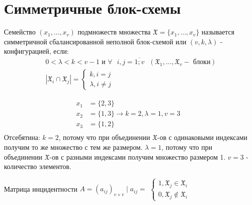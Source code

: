 \section{Симметричные блок-схемы}

\opr Семейство $(x_1, \dots, x_v)$ подмножеств множества $\mathfrak{X} = \lbrace x_1, \dots, x_v\rbrace$
называется симметричной сбалансированной неполной блок-схемой или $(v, k , \lambda)$ - конфигурацией, если:
\begin{align*}
	&0 < \lambda < k < v - 1 \text{ и } \forall \text{ } i, j  = \overline{1;v} \text{ } (\mathfrak{X}_1, \dots, \mathfrak{X}_v - \text{ блоки})\\
	&|\mathfrak{X}_i \cap \mathfrak{X}_j| = 
	\begin{cases}
		k, i = j \\
		\lambda, i \neq j
	\end{cases}
\end{align*}

\examplei

\begin{align*}
	x_1 &= \lbrace 2, 3 \rbrace \\
	x_2 &= \lbrace 1, 3 \rbrace \rightarrow k = 2, \lambda = 1, v = 3\\
	x_3 &= \lbrace 1, 2 \rbrace \\
\end{align*}
Отсебятина: $k = 2$, потому что при объединении $\mathfrak{X}$-ов с одинаковыми индексами получим то же множество с тем же размером.
$\lambda = 1$, потому что при объединении $\mathfrak{X}$-ов с разными индексами получим множество размером 1.
$v = 3$ - количество элементов.

Матрица инцидентности $A = (a_{ij})_{v \times v} \mid a_{ij} = $
$\begin{cases}
	1, \mathfrak{X}_j \in \mathfrak{X}_i \\
	0, \mathfrak{X}_j \notin \mathfrak{X}_i
\end{cases}$


